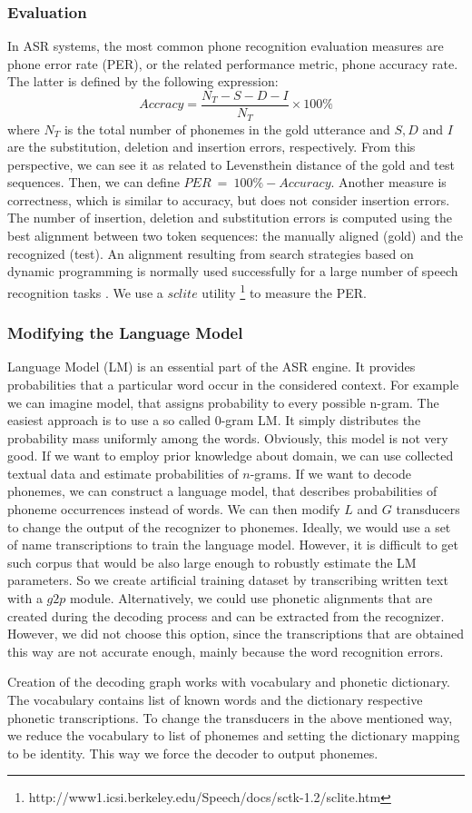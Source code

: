 \subsubsection{Evaluation}
In ASR systems, the most common phone recognition evaluation measures are phone error rate (PER), or the related performance metric, phone accuracy rate.
The latter is defined by the following expression:
\begin{equation}
Accracy = \frac{N_T - S - D - I}{N_T} \times 100\%
\end{equation}
where $N_T$ is the total number of phonemes in the gold utterance and $S, D$ and $I$ are the substitution, deletion and insertion errors, respectively.
From this perspective, we can see it as related to Levensthein distance of the gold and test sequences.
Then, we can define $PER \: = \: 100\% - Accuracy$.
Another measure is correctness, which is similar to accuracy, but does not consider insertion errors.
The number of insertion, deletion and substitution errors is computed using the best alignment between two token sequences: the manually aligned (gold) and the recognized (test).
An alignment resulting from search strategies based on dynamic programming is normally used successfully for a large number of speech recognition tasks \cite{ney2000progress}.
We use a $sclite$ utility \footnote{http://www1.icsi.berkeley.edu/Speech/docs/sctk-1.2/sclite.htm} to measure the PER.
\subsubsection{Modifying the Language Model}
Language Model (LM) is an essential part of the ASR engine.
It provides probabilities that a particular word occur in the considered context. 
For example we can imagine model, that assigns probability to every possible n-gram.
The easiest approach is to use a so called 0-gram LM.
It simply distributes the probability mass uniformly among the words.
Obviously, this model is not very good.
If we want to employ prior knowledge about domain, we can use collected textual data and estimate probabilities of $n$-grams.
If we want to decode phonemes, we can construct a language model, that describes probabilities of phoneme occurrences instead of words.
We can then modify $L$ and $G$ transducers to change the output of the recognizer to phonemes.
Ideally, we would use a set of name transcriptions to train the language model.
However, it is difficult to get such corpus that would be also large enough to robustly estimate the LM parameters. So we create artificial training dataset by transcribing written text with a $g2p$ module.
Alternatively, we could use phonetic alignments that are created during the decoding process and can be extracted from the recognizer.
However, we did not choose this option, since the transcriptions that are obtained this way are not accurate enough, mainly because the word recognition errors.
\par
Creation of the decoding graph works with vocabulary and phonetic dictionary.
The vocabulary contains list of known words and the dictionary respective phonetic transcriptions. 
To change the transducers in the above mentioned way, we reduce the vocabulary to list of phonemes and setting the dictionary mapping to be identity.
This way we force the decoder to output phonemes.
